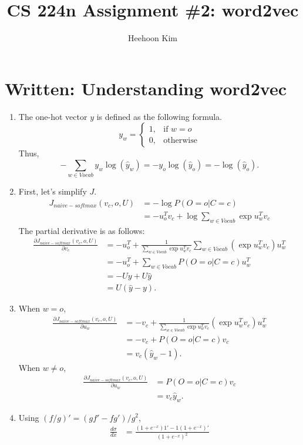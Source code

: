 \documentclass{article}
\title{CS 224n Assignment \#2: word2vec}
\author{Heehoon Kim}
\date{}
\begin{document}
\maketitle

\section{Written: Understanding word2vec}

\begin{enumerate}[label=(\alph*)]
\item The one-hot vector $y$ is defined as the following formula.
\[
y_w=\begin{cases}
1,&\text{if }w=o\\
0,&\text{otherwise}
\end{cases}
\]
Thus,
\[
-\sum_{w\in Vocab}y_w\log(\hat{y}_w)=-y_o\log(\hat{y}_o)=-\log(\hat{y}_o).
\]
\item First, let's simplify $J$.
\[
\begin{split}
J_{naive-softmax}(v_c,o,U)&=-\log{P(O=o|C=c)}\\
&=-u_o^Tv_c+\log{\sum_{w\in Vocab}\exp u_w^Tv_c}
\end{split}
\]
The partial derivative is as follows:
\[
\begin{split}
\frac{\partial J_{naive-softmax}(v_c,o,U)}{\partial v_c}&=-u_o^T+\frac{1}{\sum_{w\in Vocab}\exp u_w^Tv_c}\sum_{w\in Vocab}(\exp u_w^Tv_c)u_w^T\\
&=-u_o^T+\sum_{w\in Vocab}P(O=o|C=c)u_w^T\\
&=-Uy+U\hat{y}\\
&=U(\hat{y}-y).
\end{split}
\]
\item When $w=o$,
\[
\begin{split}
\frac{\partial J_{naive-softmax}(v_c,o,U)}{\partial u_w}&=-v_c+\frac{1}{\sum_{w\in Vocab}\exp u_w^Tv_c}(\exp u_w^Tv_c)u_w^T\\
&=-v_c+P(O=o|C=c)v_c\\
&=v_c(\hat{y}_w-1).
\end{split}
\]
When $w\neq o$,
\[
\begin{split}
\frac{\partial J_{naive-softmax}(v_c,o,U)}{\partial u_w}&=P(O=o|C=c)v_c\\
&=v_c\hat{y}_w.
\end{split}
\]
\item Using $(f/g)'=(gf'-fg')/g^2$,
\[
\begin{split}
\frac{d\sigma}{dx}&=\frac{(1+e^{-x})1'-1(1+e^{-x})'}{(1+e^{-x})^2}\\

\end{split}\]
\end{enumerate}
\end{document}
